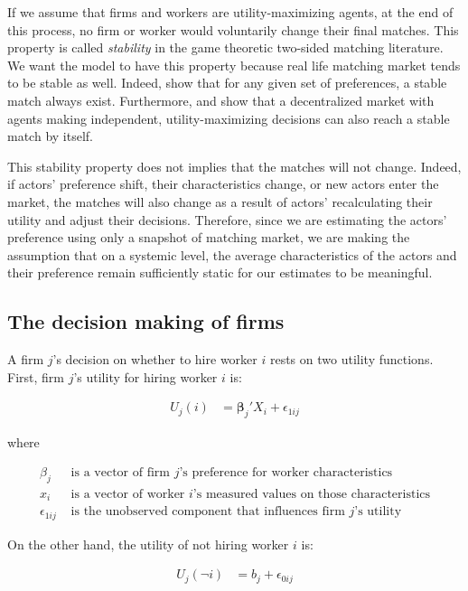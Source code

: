 If we assume that firms and workers are utility-maximizing agents, at the end of
this process, no firm or worker would voluntarily change their final matches.
This property is called \textit{stability} in the game theoretic two-sided
matching literature. We want the model to have this property because real life
matching market tends to be stable as well. Indeed, \citep{Roth1992} show that
for any given set of preferences, a stable match always exist. Furthermore,
\citep{Roth2016} and \citep{Adachi2003} show that a decentralized market with
agents making independent, utility-maximizing decisions can also reach a stable
match by itself.

This stability property does not implies that the matches will not change.
Indeed, if actors' preference shift, their characteristics change, or new actors
enter the market, the matches will also change as a result of actors'
recalculating their utility and adjust their decisions. Therefore, since we are
estimating the actors' preference using only a snapshot of matching market, we
are making the assumption that on a systemic level, the average characteristics of the
actors and their preference remain sufficiently static for our estimates to be meaningful.

\subsection{The decision making of firms}

A firm $j$'s decision on whether to hire worker $i$ rests on two utility
functions. First, firm $j$'s utility for hiring worker $i$ is:

\begin{align}
U_j(i) &= \bm{\beta}_j' X_i + \epsilon_{1ij}
\end{align}

where

\begin{align*}
\beta_j &\text{ is a vector of firm $j$'s preference for worker characteristics} \\
x_i &\text{ is a vector of worker $i$'s measured values on those characteristics} \\
\epsilon_{1ij} &\text{ is the unobserved component that influences firm $j$'s utility}
\end{align*}

On the other hand, the utility of not hiring worker $i$ is:

\begin{align}
U_j(\neg i) &= b_j + \epsilon_{0ij}
\end{align}

